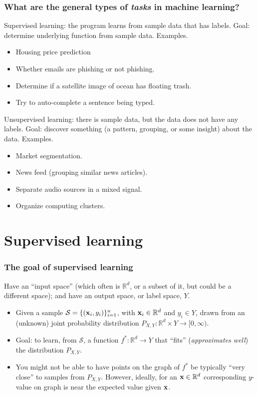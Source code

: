 \documentclass{beamer}
\theoremstyle{example}
\begin{document}
\begin{frame}
\frametitle{What are the general types of \emph{tasks} in machine learning?}
Supervised learning: the program learns from sample data that has labels. Goal: determine underlying function from sample data.\newline
\pause
{\color{mygreen}Examples.}
    \begin{itemize}
        \item Housing price prediction
        \item Whether emails are phishing or not phishing.
        \item Determine if a satellite image of ocean has floating trash.
        \item Try to auto-complete a sentence being typed.
    \end{itemize}
\pause
Unsupervised learning: there is sample data, but the data does not have any labels. Goal: discover something (a pattern, grouping, or some insight) about the data.\newline
\pause
{\color{mygreen}Examples.}
    \begin{itemize}
        \item Market segmentation.
        \item News feed (grouping similar news articles).
        \item Separate audio sources in a mixed signal.
        \item Organize computing clusters.
    \end{itemize}

\end{frame}

\section{Supervised learning}

\begin{frame}
\frametitle{The goal of supervised learning}
Have an ``input space'' (which often is $\mathbb R^{d}$, or a subset of it, but could be a different space); and have an output space, or label space, $Y$. 

\pause
\begin{itemize}
    \item Given a sample $\mathcal S = \{({\bf x}_i, y_i)\}_{i=1}^n$, with ${\bf x}_i\in\mathbb R^d$ and $y_i\in Y$, drawn from an (unknown) joint probability distribution $P_{X,Y}:\mathbb R^{d}\times Y \to [0, \infty)$. 
    \pause
    \item Goal: to learn, from $\mathcal S$, a function $f^*:\mathbb R^d\to Y$ that ``fits'' (\textit{approximates well}) the distribution $P_{X,Y}$. 
    \pause
    \item You might not be able to have points on the graph of $f^*$ be typically ``very close'' to samples from $P_{X,Y}$. However, ideally, for an ${\bf x}\in\mathbb R^d$ corresponding $y$-value on graph is near the expected value given ${\bf x}$.
\end{itemize}

\end{frame}
\end{document}
